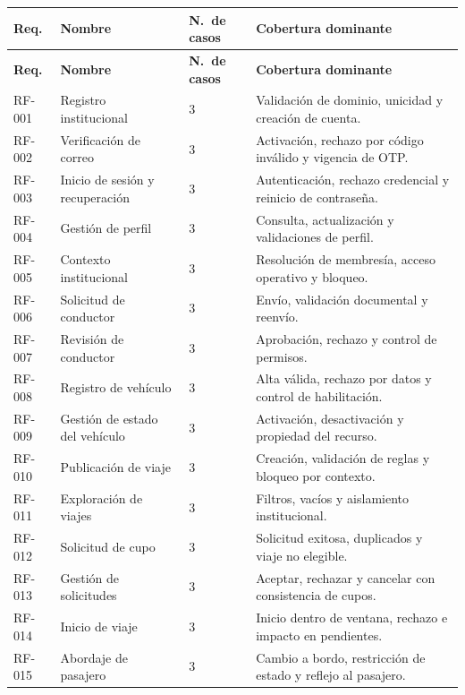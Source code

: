 \documentclass[12pt]{article}
\begin{document}
\begin{center}
\scriptsize
\begin{longtable}{|P{1.6cm}|P{4.3cm}|P{2cm}|P{6.8cm}|}
\hline
{}
\textbf{Req.} & \textbf{Nombre} & \textbf{N.\ de casos} & \textbf{Cobertura dominante} \\
\hline
\endfirsthead
\hline
{}
\textbf{Req.} & \textbf{Nombre} & \textbf{N.\ de casos} & \textbf{Cobertura dominante} \\
\hline
\endhead
RF-001 & Registro institucional & 3 & Validaci\'on de dominio, unicidad y creaci\'on de cuenta. \\
\hline
RF-002 & Verificaci\'on de correo & 3 & Activaci\'on, rechazo por c\'odigo inv\'alido y vigencia de OTP. \\
\hline
RF-003 & Inicio de sesi\'on y recuperaci\'on & 3 & Autenticaci\'on, rechazo credencial y reinicio de contrase\~na. \\
\hline
RF-004 & Gesti\'on de perfil & 3 & Consulta, actualizaci\'on y validaciones de perfil. \\
\hline
RF-005 & Contexto institucional & 3 & Resoluci\'on de membres\'ia, acceso operativo y bloqueo. \\
\hline
RF-006 & Solicitud de conductor & 3 & Env\'io, validaci\'on documental y reenv\'io. \\
\hline
RF-007 & Revisi\'on de conductor & 3 & Aprobaci\'on, rechazo y control de permisos. \\
\hline
RF-008 & Registro de veh\'iculo & 3 & Alta v\'alida, rechazo por datos y control de habilitaci\'on. \\
\hline
RF-009 & Gesti\'on de estado del veh\'iculo & 3 & Activaci\'on, desactivaci\'on y propiedad del recurso. \\
\hline
RF-010 & Publicaci\'on de viaje & 3 & Creaci\'on, validaci\'on de reglas y bloqueo por contexto. \\
\hline
RF-011 & Exploraci\'on de viajes & 3 & Filtros, vac\'ios y aislamiento institucional. \\
\hline
RF-012 & Solicitud de cupo & 3 & Solicitud exitosa, duplicados y viaje no elegible. \\
\hline
RF-013 & Gesti\'on de solicitudes & 3 & Aceptar, rechazar y cancelar con consistencia de cupos. \\
\hline
RF-014 & Inicio de viaje & 3 & Inicio dentro de ventana, rechazo e impacto en pendientes. \\
\hline
RF-015 & Abordaje de pasajero & 3 & Cambio a bordo, restricci\'on de estado y reflejo al pasajero. \\

\end{longtable}
\end{center}
\end{document}
